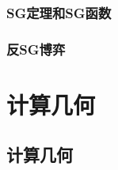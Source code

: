 \documentclass[10pt,a4paper]{article}
\begin{document}
\subsubsection{SG定理和SG函数}
\begin{spacing}{1.5}

\end{spacing}

\subsubsection{反SG博弈}
\begin{spacing}{1.5}

\end{spacing}
\section{计算几何}
\subsection{计算几何}

\end{document}
